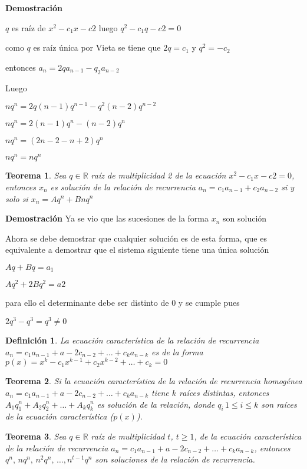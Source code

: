 \documentclass[a4paper,12pt]{report}
\newtheorem*{teo}{Teorema}
\newtheorem*{dfn}{Definición}
\begin{document}
\textbf{Demostración}

$q$ es raíz de $x^2-c_1x-c2$ luego $q^2-c_1q-c2=0$

como $q$ es raíz única por Vieta se tiene que $2q=c_1$ y $q^2=-c_2$

entonces $a_n=2qa_{n-1}-q_2a_{n-2}$

Luego 

$nq^n=2q(n-1)q^{n-1}-q^2(n-2)q^{n-2}$

$nq^n=2(n-1)q^{n}-(n-2)q^{n}$

$nq^n=(2n-2-n+2)q^{n}$

$nq^n=nq^n$


\begin{teo}
 Sea $q\in\mathbb{R}$ raíz de multiplicidad 2 de la ecuación $x^2-c_1x-c2=0$, entonces $x_n$ es solución de la relación de recurrencia $a_n=c_1a_{n-1}+c_2a_{n-2}$ si y solo si $x_n=Aq^n + Bnq^n$ 
\end{teo}

\textbf{Demostración}
Ya se vio que las sucesiones de la forma $x_n$ son solución

Ahora se debe demostrar que cualquier solución es de esta forma, que es equivalente a demostrar que el sistema siguiente tiene una única solución

$Aq+Bq=a_1$

$Aq^2+2Bq^2=a2$

para ello el determinante debe ser distinto de 0 y se cumple pues

$2q^3-q^3=q^3\neq0$

\begin{dfn}
 La ecuación característica de la relación de recurrencia\\ 
 $a_n=c_1a_{n-1}+a-2c_{n-2}+\dots+c_ka_{n-k}$ es de la forma\\ 
 $p(x)=x^k-c_1x^{k-1}+c_2x^{k-2}+\dots+c_k=0$
\end{dfn}

\begin{teo}
 Si la ecuación característica de la relación de recurrencia homogénea $a_n=c_1a_{n-1}+a-2c_{n-2}+\dots+c_ka_{n-k}$ tiene $k$ raíces distintas, entonces 
 $A_1q^n_1+A_2q^n_2+\dots+A_kq^n_k$ es solución de la relación, donde $q_i\, 1\leq i\leq k$ son raíces de la ecuación característica ($p(x)$). 
\end{teo}

\begin{teo}
 Sea $q\in\mathbb{R}$ raíz de multiplicidad $t$, $t\geq1$, de la ecuación característica de la relación de recurrencia $a_n=c_1a_{n-1}+a-2c_{n-2}+\dots+c_ka_{n-k}$, entonces $q^n,\, nq^n,\, n^2q^n,\,\dots,n^{t-1}q^n $ son soluciones de la relación de recurrencia.
\end{teo}
\end{document}

